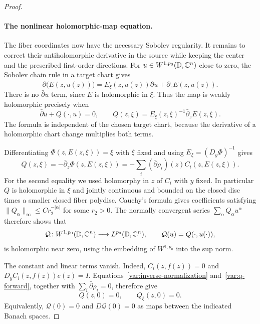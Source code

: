 \begin{proof}
\paragraph{The nonlinear holomorphic-map equation.}
The fiber coordinates now have the necessary Sobolev regularity.
It remains to correct their antiholomorphic derivative in the source
while keeping the center and the prescribed first-order directions.
For $u\in W^{1,p_0}(\mathbb D,\mathbb C^n)$ close to zero, the Sobolev chain rule
in a target chart gives
\[
 \bar\partial\bigl(E(z,u(z))\bigr)
       =E_\xi(z,u(z))\bar\partial u
          +\bar\partial_zE(z,u(z)).
\]
There is no $\bar\partial\overline u$ term, since $E$ is holomorphic
in $\xi$.  Thus the map is weakly holomorphic precisely when
\begin{equation}\label{var:nonlinear-equation}
 \bar\partial u+Q(\cdot,u)=0,
 \qquad
 Q(z,\xi)=E_\xi(z,\xi)^{-1}\bar\partial_zE(z,\xi).
\end{equation}
The formula is independent of the chosen target chart, because the
derivative of a holomorphic chart change multiplies both terms.

Differentiating $\Phi(z,E(z,\xi))=\xi$ with $\xi$ fixed and using
$E_\xi=(D_y\Phi)^{-1}$ gives
\begin{equation}\label{var:q-forward}
 Q(z,\xi)=-\bar\partial_z\Phi(z,E(z,\xi))
       =-\sum_i(\bar\partial\rho_i)(z)C_i(z,E(z,\xi)).
\end{equation}
For the second equality we used holomorphy in $z$ of $C_i$ with $y$
fixed.  In particular $Q$ is holomorphic in $\xi$ and jointly
continuous and bounded on the closed disc times a smaller closed
fiber polydisc.  Cauchy's formula gives coefficients satisfying
$\|Q_\alpha\|_\infty\le Cr_2^{-|\alpha|}$ for some $r_2>0$.
The normally convergent series $\sum_\alpha Q_\alpha u^\alpha$
therefore shows that
\begin{equation}\label{var:q-analytic}
 \mathcal Q\colon W^{1,p_0}(\mathbb D,\mathbb C^n)\longrightarrow L^{p_0}(\mathbb D,\mathbb C^n),
 \qquad \mathcal Q(u)=Q(\cdot,u(\cdot)),
\end{equation}
is holomorphic near zero, using the embedding of $W^{1,p_0}$ into
the sup norm.

The constant and linear terms vanish.  Indeed,
$C_i(z,f(z))=0$ and
$D_yC_i(z,f(z))e(z)=I$.  Equations~\eqref{var:inverse-normalization}
and~\eqref{var:q-forward}, together with
$\sum_i\bar\partial\rho_i=0$, therefore give
\begin{equation}\label{var:q-vanishing}
 Q(z,0)=0,\qquad Q_\xi(z,0)=0.
\end{equation}
Equivalently, $\mathcal Q(0)=0$ and $D\mathcal Q(0)=0$ as maps
between the indicated Banach spaces.


\end{proof}
